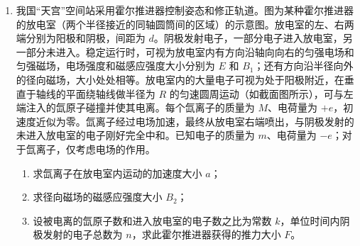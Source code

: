 \documentclass[\gkver]{gaokaozhenti}
\begin{document}
\begin{enumerate}
{$\rho = \frac{1}{8}\rho_{0}$

（2）a．此球内的质量 $M = \rho_{0}\cdot\frac{4}{3}\pi r_{0}^{3}$

P 从 $r_{0}$ 处远离到 $2r_{0}$ 处，由能量守恒定律得，动能的变化量

$\Delta E_{k} = -G\frac{Mm}{r_{0}} - \left(-G\frac{Mm}{2r_{0}}\right) = -\frac{2}{3}G\pi\rho_{0}mr_{0}^{2}$

b．由 a 知星体的速度随 $r_{0}$ 增大而减小，星体到观测点距离越大，运动时间 $t$ 越长，由 $v = Hr$ 知，$H$ 减小，故 $H$ 随 $t$ 增大而减小。
}

\item
我国“天宫”空间站采用霍尔推进器控制姿态和修正轨道。图为某种霍尔推进器的放电室（两个半径接近的同轴圆筒间的区域）的示意图。放电室的左、右两端分别为阳极和阴极，间距为 $d$。阴极发射电子，一部分电子进入放电室，另一部分未进入。稳定运行时，可视为放电室内有方向沿轴向向右的匀强电场和匀强磁场，电场强度和磁感应强度大小分别为 $E$ 和 $B_{1}$；还有方向沿半径向外的径向磁场，大小处处相等。放电室内的大量电子可视为处于阳极附近，在垂直于轴线的平面绕轴线做半径为 $R$ 的匀速圆周运动（如截面图所示），可与左端注入的氙原子碰撞并使其电离。每个氙离子的质量为 $M$、电荷量为 $+e$，初速度近似为零。氙离子经过电场加速，最终从放电室右端喷出，与阴极发射的未进入放电室的电子刚好完全中和。已知电子的质量为 $m$、电荷量为 $-e$；对于氙离子，仅考虑电场的作用。
\begin{enumerate}
	\item
	求氙离子在放电室内运动的加速度大小 $a$；
	\item
	求径向磁场的磁感应强度大小 $B_{2}$；
	\item
	设被电离的氙原子数和进入放电室的电子数之比为常数 $k$，单位时间内阴极发射的电子总数为 $n$，求此霍尔推进器获得的推力大小 $F$。
\end{enumerate}
\end{enumerate}
\end{document}
